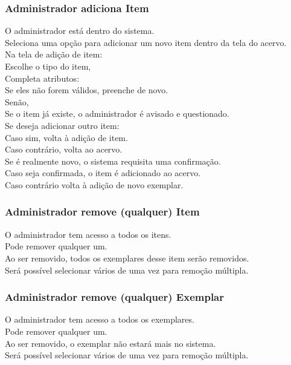 \subsubsection{Administrador adiciona Item}
\begin{tabbing}
\pgs
\>\>O administrador está dentro do sistema.\\
\>\>Seleciona uma opção para adicionar um novo item dentro da tela do acervo.\\
\>\>Na tela de adição de item:\\
\>\>\>Escolhe o tipo do item,\\
\>\>\>Completa atributos:\\
\>\>\>\>Se eles não forem válidos, preenche de novo.\\
\>\>\>\>Senão,\\
\>\>\>\>\>Se o item já existe, o administrador é avisado e questionado.\\
\>\>\>\>\>Se deseja adicionar outro item:\\
\>\>\>\>\>\>Caso sim, volta à adição de item.\\
\>\>\>\>\>\>Caso contrário, volta ao acervo.\\
\>\>\>\>\>Se é realmente novo, o sistema requisita uma confirmação.\\
\>\>\>\>\>\>Caso seja confirmada, o item é adicionado ao acervo.\\
\>\>\>\>\>\>Caso contrário volta à adição de novo exemplar.\\
\end{tabbing}

\subsubsection{Administrador remove (qualquer) Item}
\begin{tabbing}
\pgs
\>\>O administrador tem acesso a todos os itens.\\
\>\>Pode remover qualquer um.\\
\>\>Ao ser removido, todos os exemplares desse item serão removidos.\\
\>\>Será possível selecionar vários de uma vez para remoção múltipla.
\end{tabbing}

\subsubsection{Administrador remove (qualquer) Exemplar}
\begin{tabbing}
\pgs
\>\>O administrador tem acesso a todos os exemplares.\\
\>\>Pode remover qualquer um.\\
\>\>Ao ser removido, o exemplar não estará mais no sistema.\\
\>\>Será possível selecionar vários de uma vez para remoção múltipla.
\end{tabbing}

